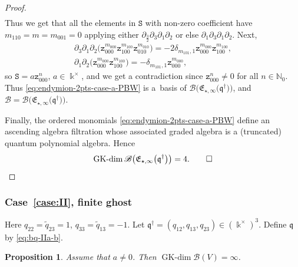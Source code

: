 \documentclass[10pt,a4paper]{amsart}
\providecommand{\qed}{\ensuremath{\square}}
\numberwithin{equation}{section}
\newtheorem{Proposition}[Theorem]{Proposition}
 { \theoremstyle{definition}
\newtheorem{Definition}[Theorem]{Definition}
\newtheorem{Note}[Theorem]{Note}
\newtheorem{Example}[Theorem]{Example}
\newtheorem{Remark}[Theorem]{Remark} }
\newcommand{\GK}{\operatorname{GK-dim}}
\newcommand{\toba}{\mathscr B}
\newcommand{\zt}{\mathtt{z}}
\newcommand{\eny}{\mathfrak{E}}
\newcommand{\enyIIb}[1]{\eny_{\star,#1}}
\newcommand{\bq}{\mathfrak{q}}
\newcommand{\bqs}{\bq^{\dagger}}
\newcommand{\tresdos}{\frac{3}{2}}
\begin{document}
\begin{proof}
\begin{gather*}
\end{gather*}
Thus we get that all the elements in $\mathtt{S}$ with non-zero coefficient have $m_{110}=m=m_{001}=0$
applying either $\partial_{\tresdos}\partial_3\partial_1\partial_2$ or else $\partial_1\partial_3\partial_1\partial_2$. Next,
\begin{gather*}
 \partial_3\partial_1\partial_2\big(\zt_{000}^{m_{000}} \zt_{100}^{m_{100}} \zt_{010}^{m_{010}}\big)
=-2\delta_{m_{101},1} \zt_{000}^{m_{000}} \zt_{100}^{m_{100}},
\\[1mm]
 \partial_1\partial_2\big(\zt_{000}^{m_{000}} \zt_{100}^{m_{100}}\big)
=-\delta_{m_{101},1} \zt_{000}^{m_{000}},
\end{gather*}
so $\mathtt{S}=a \zt_{000}^n$, $a\in\Bbbk^{\times}$, and we get a contradiction since $\zt_{000}^n\ne0$ for all $n\in\mathbb N_0$. Thus \eqref{eq:endymion-2pts-case-a-PBW} is a~basis of $\toba\big(\enyIIb{\infty}\big(\bqs\big)\big)$, and $\toba=\toba\big(\enyIIb{\infty}\big(\bqs\big)\big)$.

Finally, the ordered monomials \eqref{eq:endymion-2pts-case-a-PBW} define an ascending algebra filtration whose associated graded algebra is a
(truncated) quantum polynomial algebra. Hence
\begin{equation*}
\GK \toba\big(\enyIIb{\infty}\big(\bqs\big)\big) =4.
\tag*{\qed}
\end{equation*}
\renewcommand{\qed}{}
\end{proof}

\subsubsection[Case (II), finite ghost]{Case~\ref{case:II}, finite ghost}\label{subsubsec:caseII-2}
Here
$q_{22} = \widetilde{q}_{23} = 1$, $q_{33} = \widetilde{q}_{13}=-1$.
Let $\bqs = (q_{12}, q_{13}, q_{23}) \in (\Bbbk^{\times})^3$. Define
$\bq$ by \eqref{eq:bq-IIa-b}.



\begin{Proposition} \label{prop:endymion-two-pts-case-b}
Assume that $a\ne 0$. Then $\GK \toba(V)=\infty$.
\end{Proposition}
\end{document}
